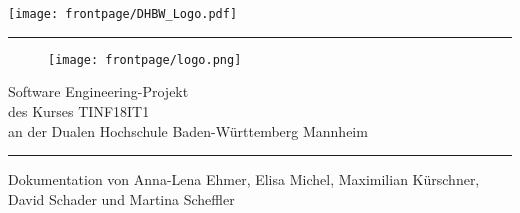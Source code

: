 \begin{titlepage}
	
	\hfill
	\begin{minipage}{.45\textwidth}
		\begin{flushright}
			\texttt{[image: frontpage/DHBW\_Logo.pdf]}
		\end{flushright}
	\end{minipage}
	
	\rule{\textwidth}{.5pt}
	
	\vspace{0.5cm}
	
	\centering
	\begin{figure}[H]
		\begin{center}
		\texttt{[image: frontpage/logo.png]}	
		\end{center}
	\end{figure}
	
	\LARGE{Software Engineering-Projekt}\\
	\vspace{0.5cm}
	\LARGE{des Kurses TINF18IT1}\\
	\vspace{0.5cm}
	\LARGE{an der Dualen Hochschule Baden-Württemberg Mannheim}\\
	\vfill
	\small
	\centering
	\rule{\textwidth}{.5pt}
	Dokumentation von Anna-Lena Ehmer, Elisa Michel, Maximilian Kürschner, David Schader und Martina Scheffler
	
\end{titlepage}